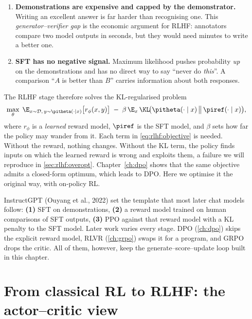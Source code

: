 \begin{enumerate}
  \item \textbf{Demonstrations are expensive and capped by the demonstrator.} Writing an excellent
        answer is far harder than recognising one. This \emph{generator--verifier gap} is the
        economic argument for RLHF: annotators compare two model outputs in seconds, but they
        would need minutes to write a better one.
  \item \textbf{SFT has no negative signal.} Maximum likelihood pushes probability \emph{up} on the
        demonstrations and has no direct way to say ``never do \emph{this}''. A comparison
        ``$A$ is better than $B$'' carries information about both responses.
\end{enumerate}

The RLHF stage therefore solves the KL-regularised problem
\begin{equation}
  \max_{\theta}\; \E_{x\sim\mathcal{D},\,y\sim\pitheta(\cdot\mid x)}
  \big[r_\phi(x,y)\big] \;-\; \beta\,\E_{x}\,
  \KL\!\big(\pitheta(\cdot\mid x)\,\big\|\,\piref(\cdot\mid x)\big),
  \label{eq:rlhf:objective}
\end{equation}
where $r_\phi$ is a \emph{learned} reward model, $\piref$ is the SFT model, and $\beta$ sets
how far the policy may wander from it. Each term in \cref{eq:rlhf:objective} is needed. Without
the reward, nothing changes. Without the KL term, the policy finds inputs on which the learned
reward is wrong and exploits them, a failure we will reproduce in \cref{sec:rlhf:overopt}.
Chapter~\ref{ch:dpo} shows that the same objective admits a closed-form optimum, which leads to
DPO. Here we optimise it the original way, with on-policy RL.

\begin{keyidea}
InstructGPT (Ouyang et al., 2022) set the template that most later chat models follow: \textbf{(1)}
SFT on demonstrations, \textbf{(2)} a reward model trained on human comparisons of SFT outputs,
\textbf{(3)} PPO against that reward model with a KL penalty to the SFT model. Later work varies
every stage. DPO (\cref{ch:dpo}) skips the explicit reward model, RLVR (\cref{ch:grpo}) swaps it
for a program, and GRPO drops the critic. All of them, however, keep the
generate--score--update loop built in this chapter.
\end{keyidea}

\section{From classical RL to RLHF: the actor--critic view}\label{sec:rlhf:actorcritic}


